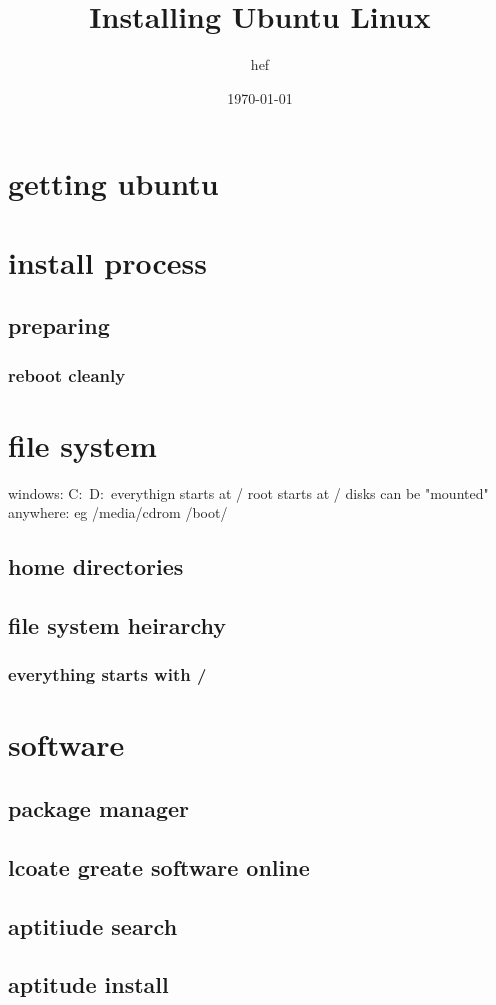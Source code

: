 \documentclass[hyperref={pdfpagelabels=false}]{beamer}
\title{Installing Ubuntu Linux}
\author{hef}
\date{\today}
\begin{document}
\frame{\titlepage}
\section[outline]{}
\frame{\tableofcontents}
\section{getting ubuntu}
\section{install process}
\subsection{preparing}
\frame
{
    \frametitle{reboot cleanly}
}
\section{file system}
windows: C:\ D:\
everythign starts at /
root starts at /
disks can be "mounted" anywhere: eg
/media/cdrom
/boot/
\subsection{home directories}
\subsection{file system heirarchy}
\frame
{
    \frametitle{everything starts with /}
    
}

\section{software}
\subsection{package manager}
\subsection{lcoate greate software online}
\subsection{aptitiude search}
\subsection{aptitude install}
\end{document}

